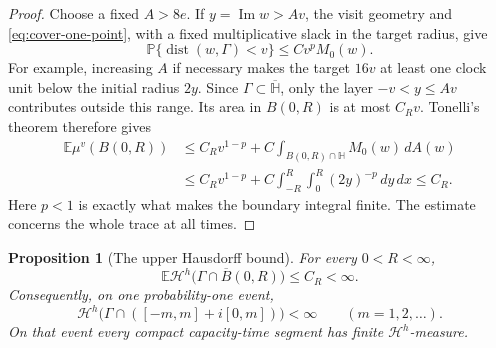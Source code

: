 \documentclass[11pt]{article}
\newtheorem{proposition}[theorem]{Proposition}
\theoremstyle{definition}
\theoremstyle{remark}
\numberwithin{equation}{section}
\begin{document}
\begin{proof}
Choose a fixed \(A>8e\).  If \(y=\operatorname{Im}w>Av\),
the visit geometry and \eqref{eq:cover-one-point}, with a fixed
multiplicative slack in the target radius, give
\[
 \mathbb P\{\operatorname{dist}(w,\Gamma)<v\}
       \le C v^p M_0(w).
\]
For example, increasing \(A\) if necessary makes the target
\(16v\) at least one clock unit below the initial radius \(2y\).
Since \(\Gamma\subset\overline{\mathbb H}\), only the layer
\(-v<y\le Av\) contributes outside this range.  Its area in
\(B(0,R)\) is at most \(C_Rv\).  Tonelli's theorem therefore gives
\begin{align*}
 \mathbb E\mu^v(B(0,R))
 &\le C_Rv^{1-p}
       +C\int_{B(0,R)\cap\mathbb H}M_0(w)\,dA(w)\\
 &\le C_Rv^{1-p}
       +C\int_{-R}^{R}\int_0^R(2y)^{-p}\,dy\,dx
 \le C_R.
\end{align*}
Here \(p<1\) is exactly what makes the boundary integral finite.
The estimate concerns the whole trace at all times.
\end{proof}

\begin{proposition}[The upper Hausdorff bound]
\label{prop:dense-cover-upper}
For every \(0<R<\infty\),
\begin{equation}
 \mathbb E\mathcal H^h
       \bigl(\Gamma\cap\overline B(0,R)\bigr)\le C_R<\infty.
 \label{eq:cover-all-time-expectation}
\end{equation}
Consequently, on one probability-one event,
\[
 \mathcal H^h\bigl(\Gamma\cap([-m,m]+i[0,m])\bigr)<\infty
       \qquad(m=1,2,\ldots).
\]
On that event every compact capacity-time segment has finite
\(\mathcal H^h\)-measure.
\end{proposition}
\end{document}
